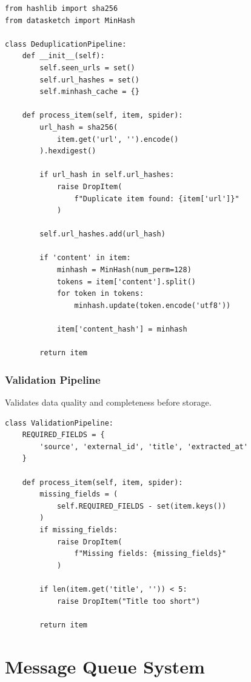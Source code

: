 \documentclass[12pt,a4paper]{report}
\begin{document}
\begin{lstlisting}
from hashlib import sha256
from datasketch import MinHash

class DeduplicationPipeline:
    def __init__(self):
        self.seen_urls = set()
        self.url_hashes = set()
        self.minhash_cache = {}
    
    def process_item(self, item, spider):
        url_hash = sha256(
            item.get('url', '').encode()
        ).hexdigest()
        
        if url_hash in self.url_hashes:
            raise DropItem(
                f"Duplicate item found: {item['url']}"
            )
        
        self.url_hashes.add(url_hash)
        
        if 'content' in item:
            minhash = MinHash(num_perm=128)
            tokens = item['content'].split()
            for token in tokens:
                minhash.update(token.encode('utf8'))
            
            item['content_hash'] = minhash
        
        return item
\end{lstlisting}

\subsection{Validation Pipeline}

Validates data quality and completeness before storage.

\begin{lstlisting}
class ValidationPipeline:
    REQUIRED_FIELDS = {
        'source', 'external_id', 'title', 'extracted_at'
    }
    
    def process_item(self, item, spider):
        missing_fields = (
            self.REQUIRED_FIELDS - set(item.keys())
        )
        if missing_fields:
            raise DropItem(
                f"Missing fields: {missing_fields}"
            )
        
        if len(item.get('title', '')) < 5:
            raise DropItem("Title too short")
        
        return item
\end{lstlisting}

\chapter{Message Queue System}
\end{document}
